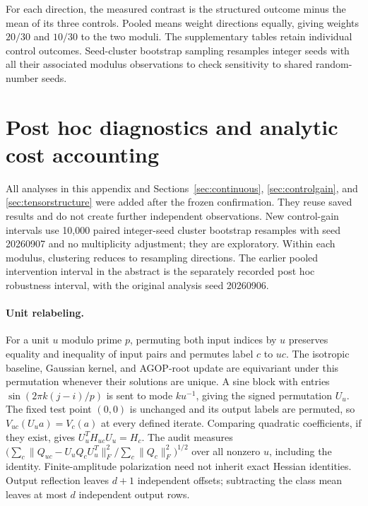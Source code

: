 \documentclass[11pt]{article}
\begin{document}
For each direction, the measured contrast is the structured outcome minus the mean of its three controls. Pooled means weight directions equally, giving weights $20/30$ and $10/30$ to the two moduli. The supplementary tables retain individual control outcomes. Seed-cluster bootstrap sampling resamples integer seeds with all their associated modulus observations to check sensitivity to shared random-number seeds.

\section{Post hoc diagnostics and analytic cost accounting}\label{app:revision}
All analyses in this appendix and Sections~\ref{sec:continuous}, \ref{sec:controlgain}, and \ref{sec:tensorstructure} were added after the frozen confirmation. They reuse saved results and do not create further independent observations. New control-gain intervals use 10,000 paired integer-seed cluster bootstrap resamples with seed 20260907 and no multiplicity adjustment; they are exploratory. Within each modulus, clustering reduces to resampling directions. The earlier pooled intervention interval in the abstract is the separately recorded post hoc robustness interval, with the original analysis seed 20260906.

\paragraph{Unit relabeling.}
For a unit $u$ modulo prime $p$, permuting both input indices by $u$ preserves equality and inequality of input pairs and permutes label $c$ to $uc$. The isotropic baseline, Gaussian kernel, and AGOP-root update are equivariant under this permutation whenever their solutions are unique. A sine block with entries $\sin(2\pi k(j-i)/p)$ is sent to mode $ku^{-1}$, giving the signed permutation $U_u$. The fixed test point $(0,0)$ is unchanged and its output labels are permuted, so $V_{uc}(U_u a)=V_c(a)$ at every defined iterate. Comparing quadratic coefficients, if they exist, gives $U_u^TH_{uc}U_u=H_c$. The audit measures $\big(\sum_c\|Q_{uc}-U_uQ_cU_u^T\|_F^2/\sum_c\|Q_c\|_F^2\big)^{1/2}$ over all nonzero $u$, including the identity. Finite-amplitude polarization need not inherit exact Hessian identities. Output reflection leaves $d+1$ independent offsets; subtracting the class mean leaves at most $d$ independent output rows.
\end{document}
